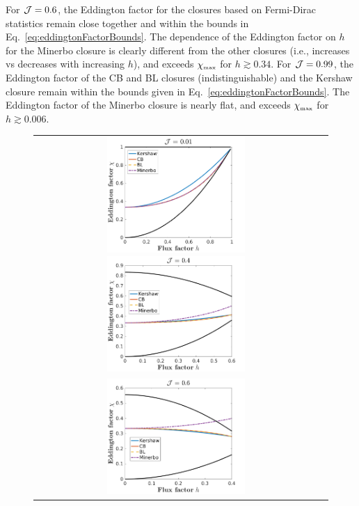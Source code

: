 For $\mathcal{J}=0.6$, the Eddington factor for the closures based on Fermi-Dirac statistics remain close together and within the bounds in Eq.~\eqref{eq:eddingtonFactorBounds}.  
The dependence of the Eddington factor on $h$ for the Minerbo closure is clearly different from the other closures (i.e., increases vs decreases with increasing $h$), and exceeds $\chi_{\mbox{\tiny max}}$ for $h\gtrsim0.34$.  
For $\mathcal{J}=0.99$, the Eddington factor of the CB and BL closures (indistinguishable) and the Kershaw closure remain within the bounds given in Eq.~\eqref{eq:eddingtonFactorBounds}.  
The Eddington factor of the Minerbo closure is nearly flat, and exceeds $\chi_{\mbox{\tiny max}}$ for $h\gtrsim0.006$.  

\begin{figure}[h]
  \centering
  \begin{tabular}{cc}
    \includegraphics[width=0.5\textwidth]{figures/Closures0_01}
    \includegraphics[width=0.5\textwidth]{figures/Closures0_40} \\
    \includegraphics[width=0.5\textwidth]{figures/Closures0_60}

\end{tabular}
\end{figure}
